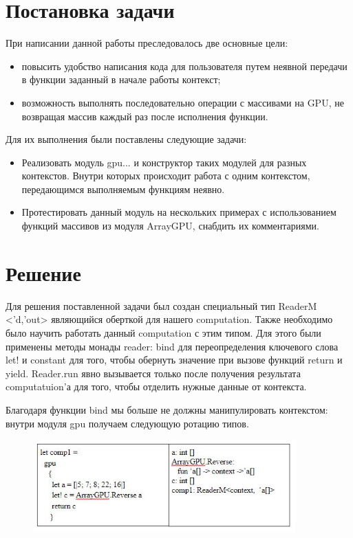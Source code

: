 \documentclass[14pt]{matmex-diploma}
\begin{document}
\section{Постановка задачи}
При написании данной работы преследовалось две основные цели:
\begin{itemize}
    \item повысить удобство написания кода для пользователя путем 	неявной передачи в функции заданный в начале работы контекст;
\item возможность выполнять последовательно операции с 	массивами на GPU, не 	возвращая массив каждый раз после исполнения функции. 	
\end{itemize}
Для их выполнения были поставлены следующие задачи:
\begin{itemize}
    \item Реализовать модуль gpu{...} и конструктор таких модулей для разных контекстов. Внутри которых происходит работа с одним контекстом, передающимся выполняемым функциям неявно.
    \item Протестировать данный модуль на нескольких примерах с использованием функций массивов из модуля ArrayGPU, снабдить их комментариями.
\end{itemize}

\section{Решение}
Для решения поставленной задачи был создан специальный тип  
ReaderM <’d,’out> являющийся оберткой для нашего computation. Также необходимо было научить работать данный computation с этим типом. Для этого были применены методы монады reader: bind для переопределения ключевого слова let! и constant для того, чтобы обернуть значение при вызове функций return и yield. Reader.run явно вызывается только после получения результата computatuion’а для того, чтобы отделить нужные данные от контекста.

Благодаря функции bind мы больше не должны манипулировать контекстом: внутри модуля gpu получаем следующую ротацию типов.
\begin{figure}[h] 
\label{table}
\centering 
\includegraphics[width=0.9\textwidth]{images/types} 
\end{figure}
\end{document}
